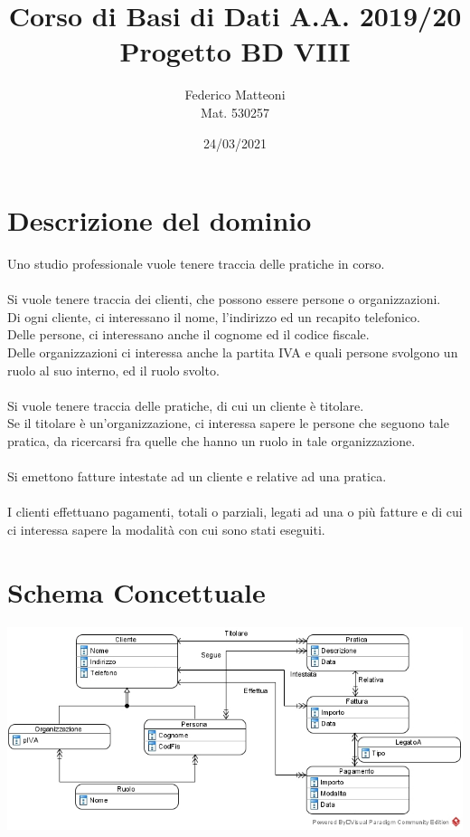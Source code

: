 \documentclass[10pt]{article}
\begin{document}
\renewcommand*\contentsname{Indice}
\title{Corso di Basi di Dati A.A. 2019/20\\Progetto BD VIII}
\author{Federico Matteoni\\Mat. 530257}
\date{24/03/2021}
\maketitle
\pagebreak
\section{Descrizione del dominio}
Uno studio professionale vuole tenere traccia delle pratiche in corso.\\\\
Si vuole tenere traccia dei clienti, che possono essere persone o organizzazioni.\\
Di ogni cliente, ci interessano il nome, l'indirizzo ed un recapito telefonico.\\
Delle persone, ci interessano anche il cognome ed il codice fiscale.\\ Delle organizzazioni ci interessa anche la partita IVA e quali persone svolgono un ruolo al suo interno, ed il ruolo svolto.\\\\
Si vuole tenere traccia delle pratiche, di cui un cliente è titolare.\\
Se il titolare è un'organizzazione, ci interessa sapere le persone che seguono tale pratica, da ricercarsi fra quelle che hanno un ruolo in tale organizzazione.\\\\
Si emettono fatture intestate ad un cliente e relative ad una pratica.\\\\
I clienti effettuano pagamenti, totali o parziali, legati ad una o più fatture e di cui ci interessa sapere la modalità con cui sono stati eseguiti.
\section{Schema Concettuale}
\begin{center}
	\includegraphics[scale=0.9]{Concettuale.jpg}
\end{center}
\end{document}
